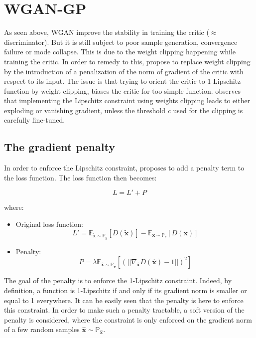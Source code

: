 \documentclass[11pt,a4paper,twoside]{report}
\begin{document}
\section{WGAN-GP}

As seen above, WGAN improve the stability in training the critic ($\approx$ discriminator). But it is still subject to poor sample generation, convergence failure or mode collapse. This is due to the weight clipping happening while training the critic. In order to remedy to this, \cite{DBLP:journals/corr/GulrajaniAADC17} propose to replace weight clipping by the introduction of a penalization of the norm of gradient of the critic with respect to its input. The issue is that trying to orient the critic to 1-Lipschitz function by weight clipping, biases the critic for too simple function. \cite{DBLP:journals/corr/GulrajaniAADC17} observes that implementing the Lipschitz constraint using weights clipping leads to either exploding or vanishing gradient, unless the threshold $c$ used for the clipping is carefully fine-tuned.

\subsection{The gradient penalty}

In order to enforce the Lipschitz constraint, \cite{DBLP:journals/corr/GulrajaniAADC17} proposes to add a penalty term to the loss function. The loss function then becomes: 

\begin{equation}
    L = L' + P
\end{equation}

where:

\begin{itemize}
    \item Original loss function: 
    \begin{equation}
        L' = \mathbb{E}_{\mathbf{\tilde{x}} \sim \mathbb{P}_g} [D(\mathbf{\tilde{x}})] - \mathbb{E}_{\mathbf{x} \sim \mathbb{P}_r} [D(\mathbf{x})]
    \end{equation}
    \item Penalty:
    \begin{equation}
        P = \lambda \mathbb{E}_{\hat{\mathbf{x}} \sim \mathbb{P}_{\hat{\mathbf{x}}}}[(||\nabla_{\hat{\mathbf{x}}} D(\hat{\mathbf{x}})-1||)^2]
    \end{equation}
\end{itemize}

The goal of the penalty is to enforce the 1-Lipschitz constraint. Indeed, by definition, a function is 1-Lipschitz if and only if its gradient norm is smaller or equal to 1 everywhere. It can be easily seen that the penalty is here to enforce this constraint. In order to make such a penalty tractable, a soft version of the penalty is considered, where the constraint is only enforced on the gradient norm of a few random samples $\hat{\mathbf{x}} \sim \mathbb{P}_{\hat{\mathbf{x}}}$.
\end{document}
